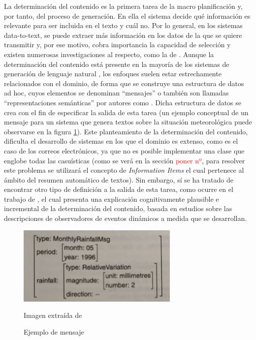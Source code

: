 La determinación del contenido es la primera tarea de la macro planificación y, por tanto, del proceso de generación. En ella el sistema decide qué información es relevante para ser incluida en el texto y cuál no. Por lo general, en los sistemas data-to-text, se puede extraer más información en los datos de la que se quiere transmitir y, por ese motivo, cobra importancia la capacidad de selección y existen numerosas investigaciones al respecto, como la de \cite{yu2007choosing}. Aunque la determinación del contenido está presente en la mayoría de los sistemas de generación de lenguaje natural \citep{mellish2006reference}, los enfoques suelen estar estrechamente relacionados con el dominio, de forma que se construye una estructura de datos ad hoc, cuyos elementos se denominan ``mensajes'' o también son llamadas ``representaciones semánticas'' por autores como \cite{duvsek2020evaluating}. Dicha estructura de datos se crea con el fin de especificar la salida de esta tarea (un ejemplo conceptual de un mensaje para un sistema que genera textos sobre la situación meteorológica puede observarse en la figura \ref{fig:messagenlg}). Este planteamiento de la determinación del contenido, dificulta el desarrollo de sistemas en los que el dominio es extenso, como es el caso de los correos electrónicos, ya que no es posible implementar una clase que englobe todas las casuísticas (como se verá en la sección \textcolor{red}{poner nº}, para resolver este problema se utilizará el concepto de \textit{Information Items} el cual pertenece al ámbito del resumen automático de textos). Sin embargo, sí se ha tratado de encontrar otro tipo de definición a la salida de esta tarea, como ocurre en el trabajo de \cite{guhe2007incremental}, el cual presenta una explicación cognitivamente plausible e incremental de la determinación del contenido, basada en estudios sobre las descripciones de observadores de eventos dinámicos a medida que se desarrollan.

\begin{figure}[h]
	\centering%
	\centerline{\includegraphics[width = 0.7\textwidth]{Imagenes/Bitmap/message-nlg.jpg}}%
	\caption{Ejemplo de mensaje}%
	Imagen extraída de \cite{biblia}
	\label{fig:messagenlg}
\end{figure}

